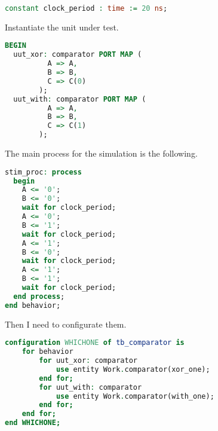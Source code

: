 \documentclass{article}
\begin{document}
\begin{lstlisting}[language=VHDL]
  constant clock_period : time := 20 ns;
\end{lstlisting}

   Instantiate the unit under test.

\begin{lstlisting}[language=VHDL]
BEGIN
  uut_xor: comparator PORT MAP (
          A => A,
          B => B,
          C => C(0)
        );
  uut_with: comparator PORT MAP (
          A => A,
          B => B,
          C => C(1)
        );
\end{lstlisting}

   The main process for the simulation is the following.

\begin{lstlisting}[language=VHDL]
  stim_proc: process
  begin		
	A <= '0';
	B <= '0';
	wait for clock_period;
	A <= '0';
	B <= '1';
	wait for clock_period;
	A <= '1';
	B <= '0';
	wait for clock_period;
	A <= '1';
	B <= '1';
	wait for clock_period;
  end process;
end behavior;
\end{lstlisting}

   Then I need to configurate them.

\begin{lstlisting}[language=VHDL]
configuration WHICHONE of tb_comparator is
	for behavior
		for uut_xor: comparator
			use entity Work.comparator(xor_one);
		end for;
		for uut_with: comparator
			use entity Work.comparator(with_one);
		end for;
	end for;
end WHICHONE;
\end{lstlisting}



   
\end{document}
